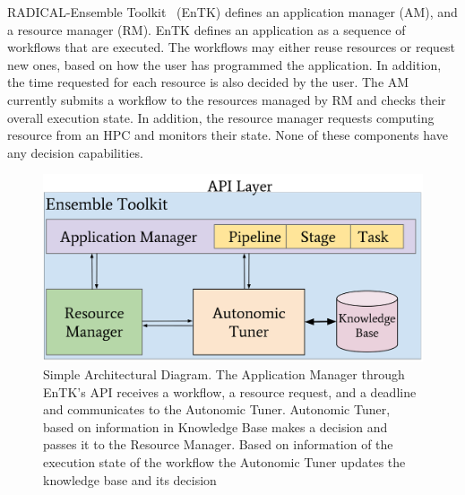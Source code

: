 RADICAL-Ensemble Toolkit~\cite{balasubramanian2018harnessing} (EnTK) defines 
an application manager (AM), and a resource manager (RM). EnTK defines an 
application as a sequence of workflows that are executed. The workflows may 
either reuse resources or request new ones, based on how the user has 
programmed the application. In addition, the time requested for each resource 
is also decided by the user. The AM currently submits a workflow to the 
resources managed by RM and checks their overall execution state. In addition,
 the resource manager requests computing resource from an HPC and monitors 
their state. None of these components have any decision capabilities.

\begin{figure}[t]
    \centering
    \includegraphics[width=.95\textwidth]{figures/AutonomicSubsystem.pdf}
    \caption{Simple Architectural Diagram. The Application Manager through 
    EnTK's API receives a workflow, a resource request, and a deadline and 
    communicates to the Autonomic Tuner. Autonomic Tuner, based on 
    information in Knowledge Base makes a decision and passes it to the 
    Resource Manager. Based on information of the execution state of the 
    workflow the Autonomic Tuner updates the knowledge base and its decision}\label{fig:architecture}
\end{figure}



